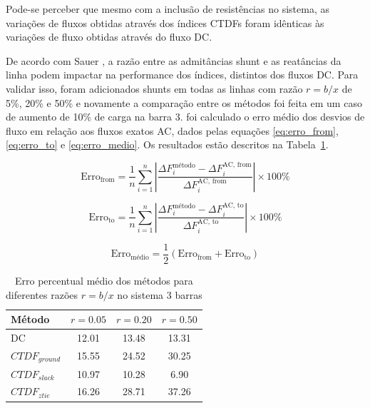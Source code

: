 \documentclass[journal]{IEEEtran}
\begin{document}
Pode-se perceber que mesmo com a inclusão de resistências no sistema, as variações de fluxos obtidas através dos índices CTDFs foram idênticas às variações de fluxo obtidas através do fluxo DC.

De acordo com Sauer \cite{ref1}, a razão entre as admitâncias shunt e as reatâncias da linha podem impactar na performance dos índices, distintos dos fluxos DC. Para validar isso, foram adicionados shunts em todas as linhas com razão $r = b/x$ de 5\%, 20\% e 50\% e novamente a comparação entre os métodos foi feita em um caso de aumento de 10\% de carga na barra 3. foi calculado o erro médio dos desvios de fluxo em relação aos fluxos exatos AC, dados pelas equações \ref{eq:erro_from}, \ref{eq:erro_to} e \ref{eq:erro_medio}. Os resultados estão descritos na Tabela~\ref{tab:erro_3bus_bx}.

\begin{equation}
\text{Erro}_{\text{from}} = \frac{1}{n} \sum_{i=1}^{n} \left| \frac{\Delta F^{\text{método}}_i - \Delta F^{\text{AC, from}}_i}{\Delta F^{\text{AC, from}}_i} \right| \times 100\%
\label{eq:erro_from}
\end{equation}

\begin{equation}
\text{Erro}_{\text{to}} = \frac{1}{n} \sum_{i=1}^{n} \left| \frac{\Delta F^{\text{método}}_i - \Delta F^{\text{AC, to}}_i}{\Delta F^{\text{AC, to}}_i} \right| \times 100\%
\label{eq:erro_to}
\end{equation}

\begin{equation}
\text{Erro}_{\text{médio}} = \frac{1}{2} \left( \text{Erro}_{\text{from}} + \text{Erro}_{\text{to}} \right)
\label{eq:erro_medio}
\end{equation}

\begin{table}[!ht]
\centering
\caption{Erro percentual médio dos métodos para diferentes razões $r = b/x$ no sistema 3 barras}
\label{tab:erro_3bus_bx}
\begin{tabular}{l|ccc}
\hline
Método & $r=0.05$ & $r=0.20$ & $r=0.50$ \\
\hline
DC                & 12.01 & 13.48 & 13.31 \\
$CTDF_{ground}$   & 15.55 & 24.52 & 30.25 \\
$CTDF_{slack}$    & 10.97 & 10.28 & 6.90 \\
$CTDF_{ztie}$     & 16.26 & 28.71 & 37.26 \\
\hline
\end{tabular}
\end{table}
\end{document}
